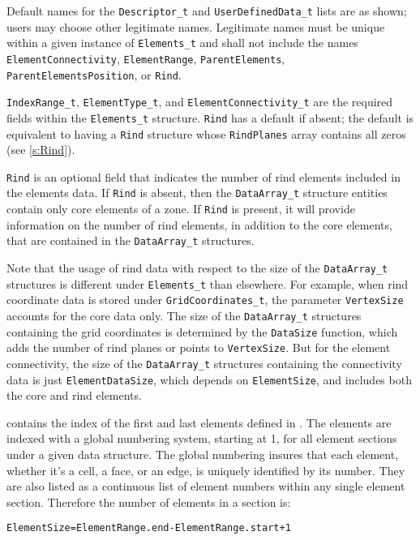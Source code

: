 \begin{notes}
\item Default names for the \texttt{Descriptor\_t} and
      \texttt{UserDefinedData\_t} lists are as shown; users may choose
      other legitimate names.
      Legitimate names must be unique within a given instance
      of \texttt{Elements\_t} and shall not include the names
      \texttt{ElementConnectivity}, \texttt{ElementRange},
      \texttt{ParentElements}, \texttt{ParentElementsPosition}, or \texttt{Rind}.
\item \texttt{IndexRange\_t}, \texttt{ElementType\_t}, and
      \texttt{ElementConnectivity\_t} are the required fields within the
      \texttt{Elements\_t} structure.
      \texttt{Rind} has a default if absent; the default is equivalent
      to having a \texttt{Rind} structure whose \texttt{RindPlanes}
      array contains all zeros (see \autoref{s:Rind}).
\end{notes}

\texttt{Rind} is an optional field that indicates the number of rind
elements included in the elements data.
If \texttt{Rind} is absent, then the \texttt{DataArray\_t} structure
entities contain only core elements of a zone.
If \texttt{Rind} is present, it will provide information on the number
of rind elements, in addition to the core elements, that are contained
in the \texttt{DataArray\_t} structures.

Note that the usage of rind data with respect to the size of the
\texttt{DataArray\_t} structures is different under \texttt{Elements\_t}
than elsewhere.
For example, when rind coordinate data is stored under
\texttt{GridCoordinates\_t}, the parameter \texttt{VertexSize} accounts
for the core data only.
The size of the \texttt{DataArray\_t} structures containing the grid
coordinates is determined by the \texttt{DataSize} function, which adds
the number of rind planes or points to \texttt{VertexSize}.
But for the element connectivity, the size of the \texttt{DataArray\_t}
structures containing the connectivity data is just
\texttt{ElementDataSize}, which depends on \texttt{ElementSize}, and
includes both the core and rind elements.

 contains the index of the first and last elements defined
in .
The elements are indexed with a global numbering system, starting at 1,
for all element sections under a given  data structure.
The global numbering insures that each element, whether it's a cell,
a face, or an edge, is uniquely identified by its number.
They are also listed as a continuous list of element numbers within
any single element section.
Therefore the number of elements in a section is:
\begin{alltt}
  ElementSize = ElementRange.end - ElementRange.start + 1
\end{alltt}

